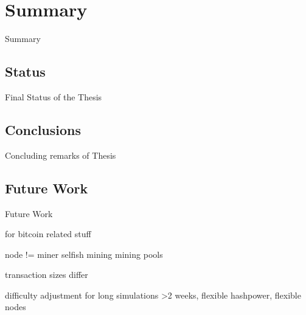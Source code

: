 \chapter{Summary} \label{chapter:summary}

Summary

\section{Status} 
\label{sec:status}

Final Status of the Thesis

\section{Conclusions}
\label{sec:conclusions}

Concluding remarks of Thesis

\section{Future Work} 
\label{sec:futureWork}

Future Work

for bitcoin related stuff

node != miner
selfish mining
mining pools

transaction sizes differ

difficulty adjustment for long simulations >2 weeks, flexible hashpower, flexible nodes